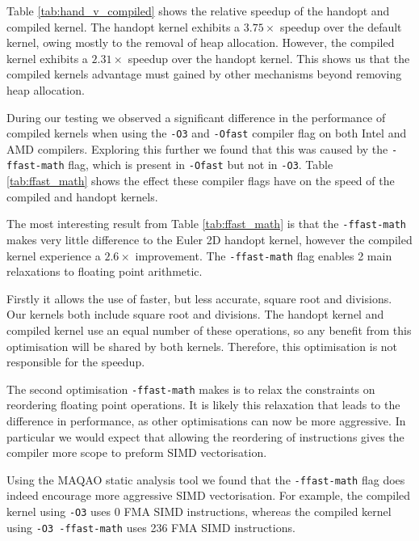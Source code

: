 Table \ref{tab:hand_v_compiled} shows the relative speedup of the handopt and compiled kernel.
The handopt kernel exhibits a $3.75\times$ speedup over the default kernel, owing mostly to the removal of heap allocation.
However, the compiled kernel exhibits a $2.31\times$ speedup over the handopt kernel.
This shows us that the compiled kernels advantage must gained by other mechanisms beyond removing heap allocation.

During our testing we observed a significant difference in the performance of compiled kernels when using the \texttt{-O3} and \texttt{-Ofast} compiler flag on both Intel and AMD compilers.
Exploring this further we found that this was caused by the \texttt{-ffast-math} flag, which is present in \texttt{-Ofast} but not in \texttt{-O3}.
Table \ref{tab:ffast_math} shows the effect these compiler flags have on the speed of the compiled and handopt kernels.

\begin{table}
    \centering
 
\caption{}\label{tab:ffast_math} 
\end{table}

The most interesting result from Table \ref{tab:ffast_math} is that the \texttt{-ffast-math} makes very little difference to the Euler 2D handopt kernel, however the compiled kernel experience a $2.6\times$ improvement.
The \texttt{-ffast-math} flag enables 2 main relaxations to floating point arithmetic.

Firstly it allows the use of faster, but less accurate, square root and divisions.
Our kernels both include square root and divisions.
The handopt kernel and compiled kernel use an equal number of these operations, so any benefit from this optimisation will be shared by both kernels.
Therefore, this optimisation is not responsible for the speedup.

The second optimisation \texttt{-ffast-math} makes is to relax the constraints on reordering floating point operations.
It is likely this relaxation that leads to the difference in performance, as other optimisations can now be more aggressive.
In particular we would expect that allowing the reordering of instructions gives the compiler more scope to preform SIMD vectorisation.

Using the MAQAO static analysis tool we found that the \texttt{-ffast-math} flag does indeed encourage more aggressive SIMD vectorisation.
For example, the compiled kernel using \texttt{-O3} uses 0 FMA SIMD instructions, whereas the compiled kernel using \texttt{-O3 -ffast-math} uses 236 FMA SIMD instructions.

